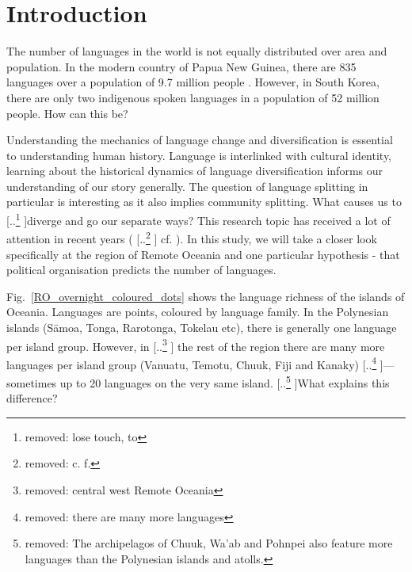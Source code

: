 \documentclass[unnumsec,webpdf,modern,medium]{oup-authoring-template}
\providecommand{\DIFaddtex}[1]{{\protect\color{blue} \sf #1}} %
\providecommand{\DIFdeltex}[1]{{\protect\color{red} [..\footnote{removed: #1} ]}} %
\providecommand{\DIFaddbegin}{} %
\providecommand{\DIFaddend}{} %
\providecommand{\DIFdelbegin}{} %
\providecommand{\DIFdelend}{} %
\providecommand{\DIFadd}[1]{\texorpdfstring{\DIFaddtex{#1}}{#1}} %
\providecommand{\DIFdel}[1]{\texorpdfstring{\DIFdeltex{#1}}{}} %
\newcommand{\DIFscaledelfig}{0.5}
\newlength{\DIFdelgraphicswidth} %
\newlength{\DIFdelgraphicsheight} %
\newcommand{\DIFaddincludegraphics}[2][]{{\color{blue}\fbox{\DIFOincludegraphics[#1]{#2}}}} %
\newcommand{\DIFdelincludegraphics}[2][]{%
\sbox{\DIFdelgraphicsbox}{\DIFOincludegraphics[#1]{#2}}%
\settoboxwidth{\DIFdelgraphicswidth}{\DIFdelgraphicsbox} %
\settoboxtotalheight{\DIFdelgraphicsheight}{\DIFdelgraphicsbox} %
\scalebox{\DIFscaledelfig}{%
\parbox[b]{\DIFdelgraphicswidth}{\usebox{\DIFdelgraphicsbox}\\[-\baselineskip] \rule{\DIFdelgraphicswidth}{0em}}\llap{\resizebox{\DIFdelgraphicswidth}{\DIFdelgraphicsheight}{%
\setlength{\unitlength}{\DIFdelgraphicswidth}%
\begin{picture}(1,1)%
\thicklines\linethickness{2pt} %
{\color[rgb]{1,0,0}\put(0,0){\framebox(1,1){}}}%
{\color[rgb]{1,0,0}\put(0,0){\line( 1,1){1}}}%
{\color[rgb]{1,0,0}\put(0,1){\line(1,-1){1}}}%
\end{picture}%
}\hspace*{3pt}}} %
} %
\DeclareRobustCommand{\DIFaddbegin}{\DIFOaddbegin \let\includegraphics\DIFaddincludegraphics} %
\DeclareRobustCommand{\DIFaddend}{\DIFOaddend \let\includegraphics\DIFOincludegraphics} %
\DeclareRobustCommand{\DIFdelbegin}{\DIFOdelbegin \let\includegraphics\DIFdelincludegraphics} %
\DeclareRobustCommand{\DIFdelend}{\DIFOaddend \let\includegraphics\DIFOincludegraphics} %
\begin{document}



\maketitle

\newpage



\onecolumn
\section{Introduction}
\doublespacing

The number of languages in the world is not equally distributed over area and population. In the modern country of Papua New Guinea, there are 835 languages over a population of 9.7 million people \citep{UN_pop, glottolog3}. However, in South Korea, there are only two indigenous spoken languages in a population of 52 million people. How can this be?

Understanding the mechanics of language change and diversification is essential to understanding human history. Language is interlinked with cultural identity, learning about the historical dynamics of language \DIFaddbegin \DIFadd{diversification }\DIFaddend informs our understanding of our story generally. The question of language splitting in particular is interesting as it also implies community splitting. What causes us to \DIFdelbegin \DIFdel{lose touch, to }\DIFdelend diverge and go \DIFaddbegin \DIFadd{our }\DIFaddend separate ways? This research topic has received a lot of attention in recent years (\DIFdelbegin \DIFdel{c. f. }\DIFdelend \DIFaddbegin \DIFadd{cf. }\DIFaddend \citet{gavin2017process,  greenhill2015demographic, Pacheco_Coelho_2019, hua2019ecological}). In this study, we will take a closer look specifically at the region of Remote Oceania \DIFaddbegin \DIFadd{and one particular hypothesis - that political organisation predicts the number of languages}\DIFaddend .

Fig.~\ref{RO_overnight_coloured_dots} shows the language richness of the islands of Oceania. Languages are points, coloured by language family. In the Polynesian islands (S\={a}moa, Tonga, Rarotonga, Tokelau etc), there is generally one language per island group. However, in \DIFdelbegin \DIFdel{central west Remote Oceania }\DIFdelend \DIFaddbegin \DIFadd{the rest of the region there are many more languages per island group }\DIFaddend (Vanuatu, Temotu, \DIFaddbegin \DIFadd{Chuuk, }\DIFaddend Fiji and Kanaky) \DIFdelbegin \DIFdel{there are many more languages }\DIFdelend --- sometimes up to 20 languages on the very same island. \DIFdelbegin \DIFdel{The archipelagos of Chuuk, Wa'ab and Pohnpei also feature more languages than the Polynesian islands and atolls. }\DIFdelend What explains this difference?
\end{document}
